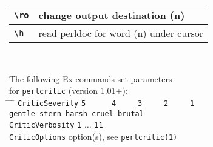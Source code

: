 \documentclass[oneside,11pt,a4paper,DIV23]{scrartcl}
\begin{document}
\begin{center}
\begin{tabular}[]{|p{10mm}|p{60mm}|}
\hline \verb'\ro' & change output destination       \hfill (n)\\
\hline
\hline
\hline \verb'\h'   & read perldoc for word     \hfill (n) \newline under cursor \\
\hline
\end{tabular} \\
\begin{tabbing}
\footnotesize{The following Ex commands set parameters} \\
\footnotesize{for \texttt{perlcritic} (version 1.01+):}        \\[1.0ex]
\hspace{1mm} \= \hspace{29mm} \= \hspace{50mm} \= \kill
 \> \texttt{CriticSeverity}  \> \texttt{5\ \ \ \ \ \ 4\ \ \ \ \ 3\ \ \ \ \ 2\ \ \ \ \ 1} \\
 \>                          \> \texttt{gentle stern harsh cruel brutal} \\
 \> \texttt{CriticVerbosity} \> \texttt{1} $\ldots$ \texttt{11}\\
 \> \texttt{CriticOptions}   \> option(s), see \texttt{perlcritic(1)} 
\end{tabbing}
\end{center}
\end{document}

